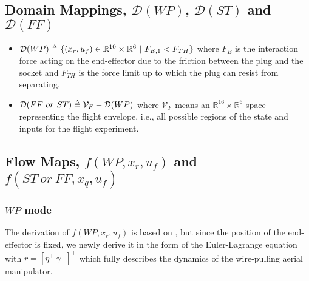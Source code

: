 \documentclass[letterpaper, 10 pt, conference]{ieeeconf}  %
\def\delequal{\mathrel{\ensurestackMath{\stackon[1pt]{=}{\scriptscriptstyle\Delta}}}}
\theoremstyle{definition}
\begin{document}
\subsection{Domain Mappings, $\mathcal{D}(WP)$, $\mathcal{D}(ST)$ and $\mathcal{D}(FF)$}
\begin{itemize}
    \item $\mathcal{D}(WP) \delequal
          \{ (x_r, u_f) \in  \mathbb{R}^{10} \times \mathbb{R}^6 \ | \ F_{E, 1} < F_{TH}\}$ where $F_{E}$ is {the interaction force} acting on the end-effector due to the friction between the plug and the socket and $F_{TH}$ is the force limit up to which the plug can resist from separating.
    \item $\mathcal{D}(FF \ or \ ST) \delequal \mathcal{V}_{F} - \mathcal{D}(WP)$ where $\mathcal{V}_{F}$ means an $\mathbb{R}^{16} \times \mathbb{R}^6$ space representing the flight envelope, i.e., all possible regions of the state and inputs for the flight experiment.
\end{itemize}

\subsection{Flow Maps, $f(WP,x_r,u_f)$ and $f(ST \ or \ FF,x_q,u_f)$} 
\subsubsection{$WP$ mode}
The derivation of $f(WP,x_r,u_f)$ is based on \cite{kim2013aerial}, but since the position of the end-effector is fixed, we newly derive it in the form of the Euler-Lagrange equation with $r = [\eta^{\top} \ \gamma^{\top}]^{\top}$ which fully describes the dynamics of the wire-pulling aerial manipulator.
\end{document}
